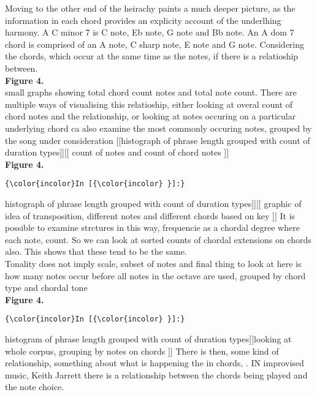 \documentclass[11pt]{article}
\begin{document}
\noindent
Moving to the other end of the heirachy paints a much deeper picture, as the information in each chord provides an explicity account of the underlhing harmony. A C minor 7 is C note, Eb note, G note and Bb note. An A dom 7 chord is comprised of an A note, C sharp note, E note and G note. Considering the chords, which occur at the same time as the notes, if there is a relatioship between.
\\

\noindent
\textbf{Figure 4.}
\\\vspace{5mm} 
 small graphs showing total chord count notes and total note count. There are multiple ways of visualising this relatioship, either looking at overal count of chord notes and the relationship, or looking at notes occuring on a particular underlying chord ca also examine the most commonly occuring notes, grouped by the song under consideration [[histograph of phrase length grouped with count of duration types]][[ count of notes and count of chord notes ]] 
\\

\noindent
\textbf{Figure 4.}
\\
    \begin{Verbatim}[commandchars=\\\{\}]
{\color{incolor}In [{\color{incolor} }]:} 
\end{Verbatim}
\vspace{5mm} 
\noindent
histograph of phrase length grouped with count of duration types]][[ graphic of idea of transposition, different notes and different chords based on key ]] It is possible to examine strctures in this way, frequencie as a chordal degree where each note, count. So we can look at sorted counts of chordal extensions on chords also. This shows that these tend to be the same.
\\

\noindent
Tonality does not imply scale, subset of notes and final thing to look at here is how many notes occur before all notes in the octave are used, grouped by chord type and chordal tone
\\

\noindent
\textbf{Figure 4.}
\\
    \begin{Verbatim}[commandchars=\\\{\}]
{\color{incolor}In [{\color{incolor} }]:} 
\end{Verbatim}
\vspace{5mm} 
\noindent
histogram of phrase length grouped with count of duration types]]looking at whole corpus, grouping by notes on chords ]] There is then, some kind of relationship, something about what is happening the in chords, . IN improvised music, Keith Jarrett there is a relationship between the chords being played and the note choice.
\\
\end{document}
